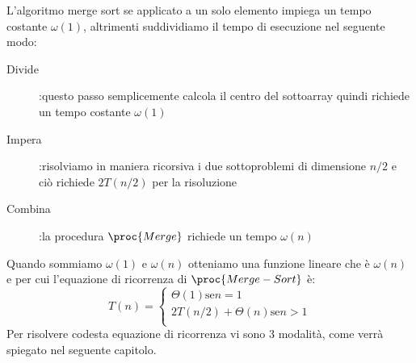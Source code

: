 L'algoritmo merge sort se applicato a un solo elemento impiega un tempo costante $\omega(1)$,
altrimenti suddividiamo il tempo di esecuzione nel seguente modo:
\begin{description}
    \item[Divide]:questo passo semplicemente calcola il centro del sottoarray quindi
                  richiede un tempo costante $\omega(1)$
    \item[Impera]:risolviamo in maniera ricorsiva i due sottoproblemi di dimensione $n/2$
                  e ciò richiede $2T(n/2)$ per la risoluzione
    \item[Combina]:la procedura $\proc{Merge}$ richiede un tempo $\omega(n)$
\end{description}
Quando sommiamo $\omega(1)$ e $\omega(n)$ otteniamo una funzione lineare che è $\omega(n)$
e per cui l'equazione di ricorrenza di $\proc{Merge-Sort}$ è:
\begin{equation*}
    T(n) = \begin{cases} \Theta(1) \text{se} n = 1 \\
                         2T(n/2) + \Theta(n) \text{se} n > 1 \\
           \end{cases}
\end{equation*}
Per risolvere codesta equazione di ricorrenza vi sono 3 modalità, come verrà spiegato
nel seguente capitolo.

